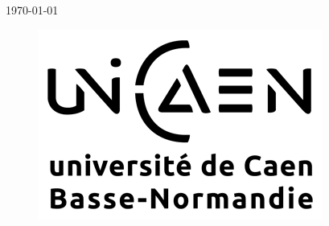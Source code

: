 \begin{titlepage}

{\large \today}\\[3cm] %



\begin{figure}[H]
    \begin{center}
      \includegraphics[scale=1]{images/LogoUnicaen}
    \end{center}
    \label{frbr-resume}
\end{figure}


\vfill %

\end{titlepage}